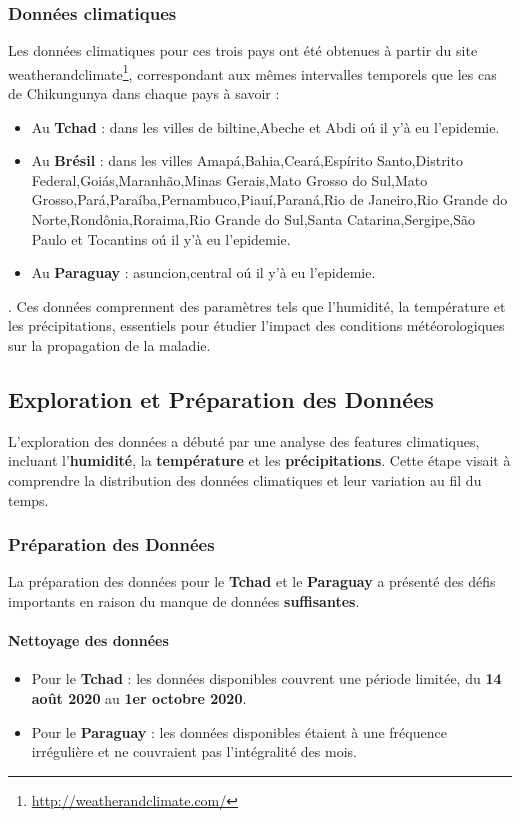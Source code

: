 \subsubsection{Données climatiques}
Les données climatiques pour ces trois pays ont été obtenues à partir du site weatherandclimate\footnote{\url{http://weatherandclimate.com/}}, correspondant aux mêmes intervalles temporels que les cas de Chikungunya dans chaque pays à savoir : 
\begin{itemize}
	\item Au \textbf{Tchad} : dans les villes de biltine,Abeche et Abdi oú il y'à eu l'epidemie.
	\item Au \textbf{Brésil} : dans les villes Amapá,Bahia,Ceará,Espírito Santo,Distrito Federal,Goiás,Maranhão,Minas Gerais,Mato Grosso do Sul,Mato Grosso,Pará,Paraíba,Pernambuco,Piauí,Paraná,Rio de Janeiro,Rio Grande do Norte,Rondônia,Roraima,Rio Grande do Sul,Santa Catarina,Sergipe,São Paulo et Tocantins oú il y'à eu l'epidemie.
	\item Au \textbf{Paraguay} : asuncion,central oú il y'à eu l'epidemie.
\end{itemize}.
Ces données comprennent des paramètres tels que l'humidité, la température et les précipitations, essentiels pour étudier l'impact des conditions météorologiques sur la propagation de la maladie.

\subsection{Exploration et Préparation des Données}
L'exploration des données a débuté par une analyse des features climatiques, incluant l'\textbf{humidité}, la \textbf{température} et les \textbf{précipitations}. Cette étape visait à comprendre la distribution des données climatiques et leur variation au fil du temps.
\subsubsection{Préparation des Données}
La préparation des données pour le \textbf{Tchad} et le \textbf{Paraguay} a présenté des défis importants en raison du manque de données \textbf{suffisantes}.

\paragraph*{Nettoyage des données}
\begin{itemize}
	\item Pour le \textbf{Tchad} : les données disponibles couvrent une période limitée, du \textbf{14 août 2020} au \textbf{1er octobre 2020}.
	\item Pour le \textbf{Paraguay} : les données disponibles étaient à une fréquence irrégulière et ne couvraient pas l'intégralité des mois.
\end{itemize}

